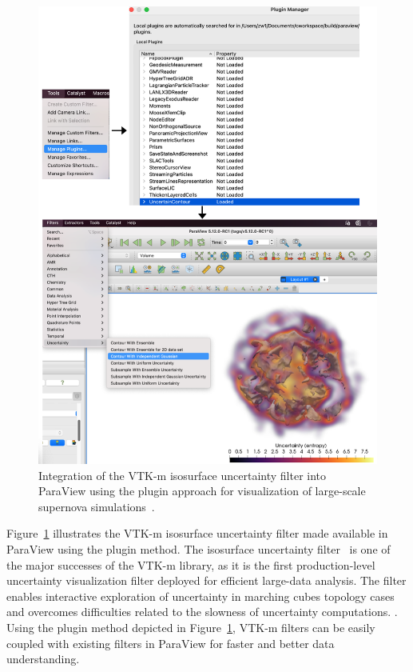 \begin{figure}[htb]
  \includegraphics[width=\linewidth]{figures/isosurfaceUncertaintyPlugin.png}
  \caption{Integration of the VTK-m isosurface uncertainty filter into ParaView using the plugin approach for visualization of large-scale supernova simulations~\cite{Sandoval2021}.}
  \label{fig:uncertainty-plugin}
\end{figure}

Figure~\ref{fig:uncertainty-plugin} illustrates the VTK-m isosurface uncertainty filter made available in ParaView using the plugin method. The isosurface uncertainty filter~\cite{Wang2023} is one of the major successes of the VTK-m library, as it is the first production-level uncertainty visualization filter deployed for efficient large-data analysis. The filter enables interactive exploration of uncertainty in marching cubes topology cases~\cite{Athawale21} and overcomes difficulties related to the slowness of uncertainty computations. . Using the plugin method depicted in Figure~\ref{fig:uncertainty-plugin}, VTK-m filters can be easily coupled with existing filters in ParaView for faster and better data understanding.

